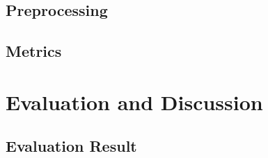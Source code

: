 \subsection{Preprocessing}


\subsection{Metrics}

\section{Evaluation and Discussion}

\subsection{Evaluation Result}










	 